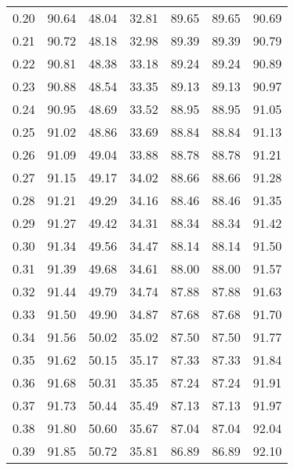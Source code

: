 \begin{tabular}{|c|c|c|c|c|c|c|}
      0.20 &     90.64 &     48.04 &      32.81 &   89.65 &      89.65 &         90.69 \\
      0.21 &     90.72 &     48.18 &      32.98 &   89.39 &      89.39 &         90.79 \\
      0.22 &     90.81 &     48.38 &      33.18 &   89.24 &      89.24 &         90.89 \\
      0.23 &     90.88 &     48.54 &      33.35 &   89.13 &      89.13 &         90.97 \\
      0.24 &     90.95 &     48.69 &      33.52 &   88.95 &      88.95 &         91.05 \\
      0.25 &     91.02 &     48.86 &      33.69 &   88.84 &      88.84 &         91.13 \\
      0.26 &     91.09 &     49.04 &      33.88 &   88.78 &      88.78 &         91.21 \\
      0.27 &     91.15 &     49.17 &      34.02 &   88.66 &      88.66 &         91.28 \\
      0.28 &     91.21 &     49.29 &      34.16 &   88.46 &      88.46 &         91.35 \\
      0.29 &     91.27 &     49.42 &      34.31 &   88.34 &      88.34 &         91.42 \\
      0.30 &     91.34 &     49.56 &      34.47 &   88.14 &      88.14 &         91.50 \\
      0.31 &     91.39 &     49.68 &      34.61 &   88.00 &      88.00 &         91.57 \\
      0.32 &     91.44 &     49.79 &      34.74 &   87.88 &      87.88 &         91.63 \\
      0.33 &     91.50 &     49.90 &      34.87 &   87.68 &      87.68 &         91.70 \\
      0.34 &     91.56 &     50.02 &      35.02 &   87.50 &      87.50 &         91.77 \\
      0.35 &     91.62 &     50.15 &      35.17 &   87.33 &      87.33 &         91.84 \\
      0.36 &     91.68 &     50.31 &      35.35 &   87.24 &      87.24 &         91.91 \\
      0.37 &     91.73 &     50.44 &      35.49 &   87.13 &      87.13 &         91.97 \\
      0.38 &     91.80 &     50.60 &      35.67 &   87.04 &      87.04 &         92.04 \\
      0.39 &     91.85 &     50.72 &      35.81 &   86.89 &      86.89 &         92.10 \\

\end{tabular}
